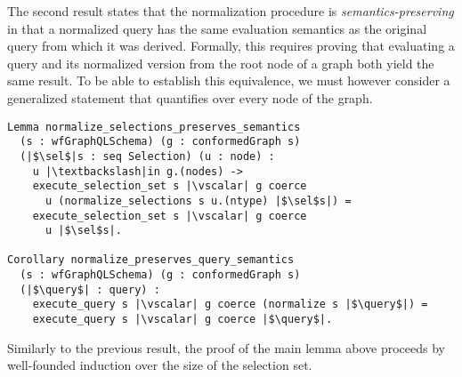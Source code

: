 The second result states that the normalization procedure is {\em
  semantics-preserving} in that a normalized query has the same
evaluation semantics as the original query from which it was
derived. Formally, this requires proving that evaluating a query and
its normalized version from the root node of a graph both yield the
same result. To be able to establish this equivalence, we must however
consider a generalized statement that quantifies over every node of the
graph.

\begin{verbatim}
Lemma normalize_selections_preserves_semantics
  (s : wfGraphQLSchema) (g : conformedGraph s) 
  (|$\sel$|s : seq Selection) (u : node) :
    u |\textbackslash|in g.(nodes) ->
    execute_selection_set s |\vscalar| g coerce
      u (normalize_selections s u.(ntype) |$\sel$s|) =
    execute_selection_set s |\vscalar| g coerce
      u |$\sel$s|.

Corollary normalize_preserves_query_semantics 
  (s : wfGraphQLSchema) (g : conformedGraph s)
  (|$\query$| : query) :
    execute_query s |\vscalar| g coerce (normalize s |$\query$|) =
    execute_query s |\vscalar| g coerce |$\query$|.
\end{verbatim}

\noindent Similarly to the previous result, the proof of the main lemma above
proceeds by well-founded induction over the size of the selection
set.


